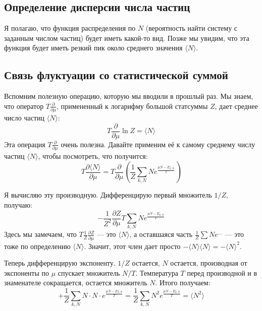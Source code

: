 \documentclass[../general/general]{subfiles}
\begin{document}
\subsection{Определение дисперсии числа частиц}

Я полагаю, что функция распределения по $N$ (вероятность найти систему с заданным числом частиц) будет иметь какой-то вид. Позже мы увидим, что эта функция будет иметь резкий пик около среднего значения $\langle N \rangle$. 

\subsection{Связь флуктуации со статистической суммой}

Вспомним полезную операцию, которую мы вводили в прошлый раз. Мы знаем, что оператор $T \frac{\partial}{\partial \mu}$, примененный к логарифму большой статсуммы $Z$, дает среднее число частиц $\langle N \rangle$:
\begin{equation}
    T \frac{\partial}{\partial \mu} \ln Z = \langle N \rangle
\end{equation}
Эта операция $T \frac{\partial}{\partial \mu}$ очень полезна. Давайте применим её к самому среднему числу частиц $\langle N \rangle$, чтобы посмотреть, что получится:
\begin{equation}
    T \frac{\partial \langle N \rangle}{\partial \mu} = T \frac{\partial}{\partial \mu} \left( \frac{1}{Z} \sum_{k,N} N e^{\frac{\mu N - E_{k,N}}{T}} \right)
\end{equation}

Я вычисляю эту производную. Дифференцирую первый множитель $1/Z$, получаю:
\begin{equation}
    - \frac{1}{Z^2} \frac{\partial Z}{\partial \mu} T \sum_{k,N} N e^{\frac{\mu N - E_{k,N}}{T}}
\end{equation}
Здесь мы замечаем, что $T \frac{1}{Z} \frac{\partial Z}{\partial \mu}$ — это $\langle N \rangle$, а оставшаяся часть $\frac{1}{Z} \sum N e^{\dots}$ — это тоже по определению $\langle N \rangle$. Значит, этот член дает просто $-\langle N \rangle \langle N \rangle = -\langle N \rangle^2$.

Теперь дифференцирую экспоненту. $1/Z$ остается, $N$ остается, производная от экспоненты по $\mu$ спускает множитель $N/T$. Температура $T$ перед производной и в знаменателе сокращается, остается множитель $N$. Итого получаем:
\begin{equation}
    + \frac{1}{Z} \sum_{k,N} N \cdot N \cdot e^{\frac{\mu N - E_{k,N}}{T}} = \frac{1}{Z} \sum_{k,N} N^2 e^{\frac{\mu N - E_{k,N}}{T}} = \langle N^2 \rangle
\end{equation}
\end{document}
